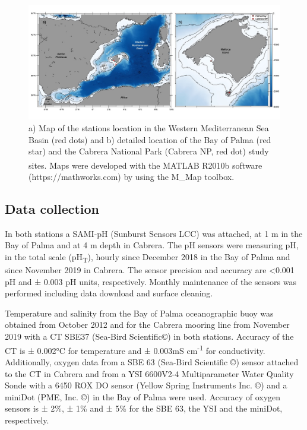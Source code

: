 \begin{figure}[H]
    \centering
    \includegraphics[width=\textwidth]{Figures/Fig_1.jpg}
    \caption[Map of the stations location in the Western Mediterranean Sea
        Basin]{a) Map of the stations location in the Western Mediterranean Sea
        Basin (red dots) and b) detailed location of the Bay of Palma (red
        star) and
        the Cabrera National Park (Cabrera NP, red dot) study sites. Maps were
        developed with the MATLAB\textsuperscript{\textregistered} R2010b
        software
        (https://mathworks.com) by using the M\_Map
        toolbox\cite{pawlowicz2020m_map}.}
    \label{fig:1}
\end{figure}

\subsection{Data collection}
In both stations a SAMI-pH (Sunburst Sensors LCC) was attached, at 1 m in
the Bay of Palma and at 4 m depth in Cabrera. The pH sensors were measuring pH,
in the total scale (pH\textsubscript{T}), hourly since December 2018 in the Bay
of Palma and since November 2019 in Cabrera. The sensor precision and accuracy
are <0.001 pH and ± 0.003 pH units, respectively. Monthly maintenance of the
sensors was performed including data download and surface cleaning.

Temperature and salinity from the Bay of Palma oceanographic buoy was
obtained from October 2012 and for the Cabrera mooring line from November 2019
with a CT SBE37 (Sea-Bird Scientific©) in both stations. Accuracy of the CT is
± 0.002°C for temperature and ± 0.003mS cm\textsuperscript{-1} for
conductivity.  Additionally, oxygen data from a SBE 63 (Sea-Bird Scientific ©)
sensor attached to the CT in Cabrera and from a YSI 6600V2-4 Multiparameter
Water Quality Sonde with a 6450 ROX DO sensor (Yellow Spring Instruments Inc.
©)\cite{tintore2022} and a miniDot (PME, Inc. ©) in the Bay of Palma were used.
Accuracy of oxygen sensors is ± 2\%, ± 1\% and ± 5\% for the SBE 63, the YSI
and the miniDot, respectively.

